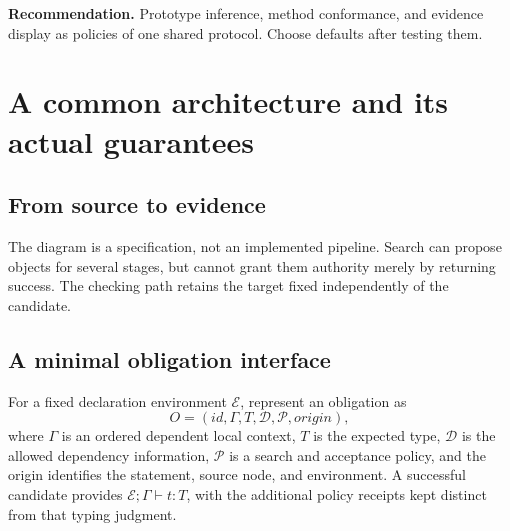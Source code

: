 \documentclass[11pt,letterpaper]{article}
\newcommand{\decision}[1]{\par\smallskip\noindent\textbf{Recommendation.} #1\par\smallskip}
\begin{document}
\decision{Prototype inference, method conformance, and evidence display as policies
of one shared protocol. Choose defaults after testing them.}

\clearpage
\section{A common architecture and its actual guarantees}\label{sec:architecture}
\subsection{From source to evidence}
\begin{center}
\end{center}
The diagram is a specification, not an implemented pipeline. Search can propose
objects for several stages, but cannot grant them authority merely by returning
success. The checking path retains the target fixed independently of the candidate.

\subsection{A minimal obligation interface}
For a fixed declaration environment \(\mathcal E\), represent an obligation as
\[
 O=(\mathit{id},\Gamma,T,\mathcal D,\mathcal P,\mathit{origin}),
\]
where \(\Gamma\) is an ordered dependent local context, \(T\) is the expected type,
\(\mathcal D\) is the allowed dependency information, \(\mathcal P\) is a search
and acceptance policy, and the origin identifies the statement, source node, and
environment. A successful candidate provides \(\mathcal E;\Gamma\vdash t:T\),
with the additional policy receipts kept distinct from that typing judgment.
\end{document}
